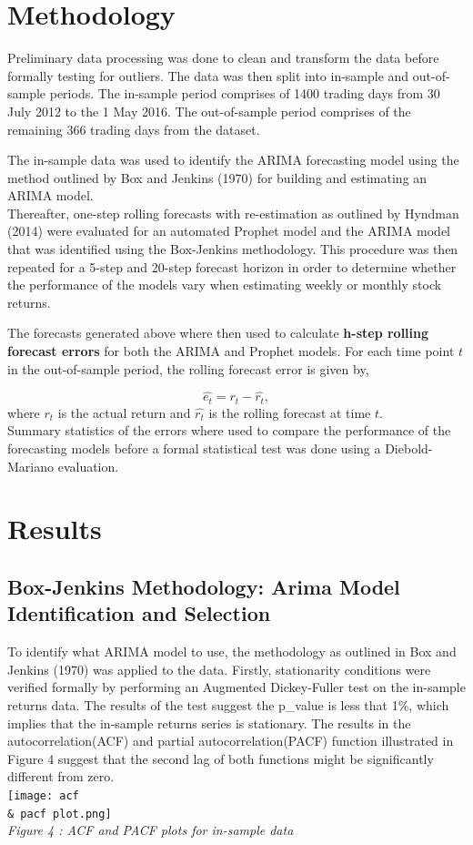 \documentclass[12pt,a4paper]{article}
\numberwithin{equation}{section}
\numberwithin{figure}{section}
\numberwithin{table}{section}
\begin{document}
\section{Methodology}\label{methodology}

Preliminary data processing was done to clean and transform the data
before formally testing for outliers. The data was then split into
in-sample and out-of-sample periods. The in-sample period comprises of
1400 trading days from 30 July 2012 to the 1 May 2016. The out-of-sample
period comprises of the remaining 366 trading days from the dataset.

The in-sample data was used to identify the ARIMA forecasting model
using the method outlined by Box and Jenkins (1970) for building and
estimating an ARIMA model.\\
Thereafter, one-step rolling forecasts with re-estimation as outlined by
Hyndman (2014) were evaluated for an automated Prophet model and the
ARIMA model that was identified using the Box-Jenkins methodology. This
procedure was then repeated for a 5-step and 20-step forecast horizon in
order to determine whether the performance of the models vary when
estimating weekly or monthly stock returns.

The forecasts generated above where then used to calculate
\textbf{h-step rolling forecast errors} for both the ARIMA and Prophet
models. For each time point \(t\) in the out-of-sample period, the
rolling forecast error is given by,

\[ \hat{e_t} = r_t - \hat{r_t},\] where \(r_t\) is the actual return and
\(\hat{r_t}\) is the rolling forecast at time \(t\).\\
Summary statistics of the errors where used to compare the performance
of the forecasting models before a formal statistical test was done
using a Diebold-Mariano evaluation.

\section{Results}\label{results}

\subsection{Box-Jenkins Methodology: Arima Model Identification and
Selection}\label{box-jenkins-methodology-arima-model-identification-and-selection}

To identify what ARIMA model to use, the methodology as outlined in Box
and Jenkins (1970) was applied to the data. Firstly, stationarity
conditions were verified formally by performing an Augmented
Dickey-Fuller test on the in-sample returns data. The results of the
test suggest the p\_value is less that 1\%, which implies that the
in-sample returns series is stationary. The results in the
autocorrelation(ACF) and partial autocorrelation(PACF) function
illustrated in Figure 4 suggest that the second lag of both functions
might be significantly different from zero.\\
\texttt{[image: acf \\\& pacf plot.png]}\\
\emph{Figure 4 : ACF and PACF plots for in-sample data}
\end{document}
